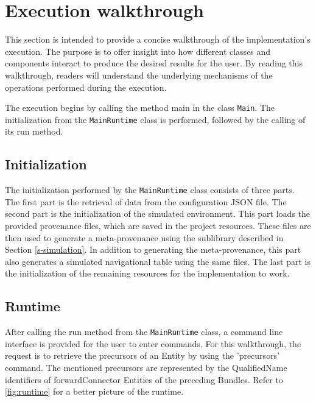 \documentclass[
  digital,     %
  oneside,     %
  nosansbold,  %
  nocolorbold, %
  lof,         %
  lot,         %
]{fithesis4}
\begin{document}
\section{Execution walkthrough}
This section is intended to provide a concise walkthrough of the implementation's execution. The purpose is to offer insight into how different classes and components interact to produce the desired results for the user. By reading this walkthrough, readers will understand the underlying mechanisms of the operations performed during the execution. 

The execution begins by calling the method main in the class \texttt{Main}. The initialization from the \texttt{MainRuntime} class is performed, followed by the calling of its run method.

\subsection{Initialization}
The initialization performed by the \texttt{MainRuntime} class consists of three parts. The first part is the retrieval of data from the configuration JSON file. The second part is the initialization of the simulated environment. This part loads the provided provenance files, which are saved in the project resources. These files are then used to generate a meta-provenance using the sublibrary described in Section \ref{s-simulation}. In addition to generating the meta-provenance, this part also generates a simulated navigational table using the same files. The last part is the initialization of the remaining resources for the implementation to work.

\subsection{Runtime}
After calling the run method from the \texttt{MainRuntime} class, a command line interface is provided for the user to enter commands. For this walkthrough, the request is to retrieve the precursors of an Entity by using the 'precursors' command. The mentioned precursors are represented by the QualifiedName identifiers of forwardConnector Entities of the preceding Bundles. Refer to \ref{fig:runtime} for a better picture of the runtime.
\end{document}
